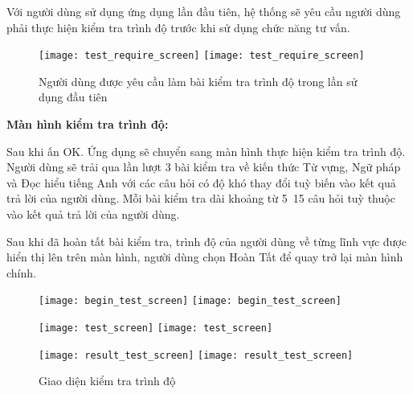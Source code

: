 \pagebreak 
Với người dùng sử dụng ứng dụng lần đầu tiên, hệ thống sẽ yêu cầu người dùng phải thực hiện kiểm tra trình độ trước khi sử dụng chức năng tư vấn. \\	

\begin{figure}[H]
  \begin{minipage}[b]{1\linewidth}
  	\centering
      \ifpdf
      \texttt{[image: test\_require\_screen]}
    \else
      \texttt{[image: test\_require\_screen]}
    \fi  	
  \end{minipage}
    \captionsetup{justification=centering, margin=2cm}
    \caption{Người dùng được yêu cầu làm bài kiểm tra trình độ trong lần sử dụng đầu tiên}
    \label{RequireTestScreen}
\end{figure}

\textbf{Màn hình kiểm tra trình độ:}
\vskip 0.1in

Sau khi ấn OK. Ứng dụng sẽ chuyển sang màn hình thực hiện kiểm tra trình độ. Người dùng sẽ trải qua lần lượt 3 bài kiểm tra về kiến thức Từ vựng, Ngữ pháp và Đọc hiểu tiếng Anh với các câu hỏi có độ khó thay đổi tuỳ biến vào kết quả trả lời của người dùng. Mỗi bài kiểm tra dài khoảng từ 5~15 câu hỏi tuỳ thuộc vào kết quả trả lời của người dùng.

Sau khi đã hoàn tất bài kiểm tra, trình độ của người dùng về từng lĩnh vực được hiển thị lên trên màn hình, người dùng chọn Hoàn Tất để quay trở lại màn hình chính.

\begin{figure}[H]
    \begin{minipage}[b]{0.50\linewidth}
  	\centering
      \ifpdf
      \texttt{[image: begin\_test\_screen]}
    \else
      \texttt{[image: begin\_test\_screen]}
    \fi  	
  \end{minipage}
      \begin{minipage}[b]{0.50\linewidth}
  	\centering
      \ifpdf
      \texttt{[image: test\_screen]}
    \else
      \texttt{[image: test\_screen]}
    \fi  	
  \end{minipage}
      \begin{minipage}[b]{1\linewidth}
  	\centering
      \ifpdf
      \texttt{[image: result\_test\_screen]}
    \else
      \texttt{[image: result\_test\_screen]}
    \fi  	
  \end{minipage}
    \caption{Giao diện kiểm tra trình độ}
    \label{TestScreen}
\end{figure}

